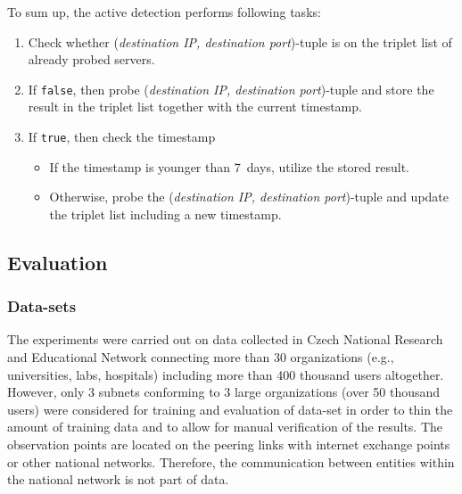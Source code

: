 \documentclass[preprint,12pt,3p]{elsarticle}
\begin{document}

To sum up, the active detection performs following tasks:
\begin{enumerate}
    \item Check whether (\textit{destination IP, destination port})-tuple is on the triplet list of already probed servers.
    \item If \texttt{false}, then probe (\textit{destination IP, destination port})-tuple and store the result in the triplet list together with the current timestamp.
    \item If \texttt{true}, then check the timestamp
    \begin{itemize}
        \item If the timestamp is younger than 7~days, utilize the stored result.
        \item Otherwise, probe the (\textit{destination IP, destination port})-tuple and update the triplet list including a new timestamp.
    \end{itemize}
\end{enumerate}

\subsection{Evaluation}
\label{subsec43}

\subsubsection{Data-sets}
\label{subsubsec431}

The experiments were carried out on data collected in Czech National Research and Educational Network connecting more than 30 organizations (e.g., universities, labs, hospitals) including more than 400 thousand users altogether. 
However, only 3 subnets conforming to 3 large organizations (over 50 thousand users) were considered for training and evaluation of data-set in order to thin the amount of training data and to allow for manual verification of the results. 
The observation points are located on the peering links with internet exchange points or other national networks. Therefore, the communication between entities within the national network is not part of data.
 
\end{document}

